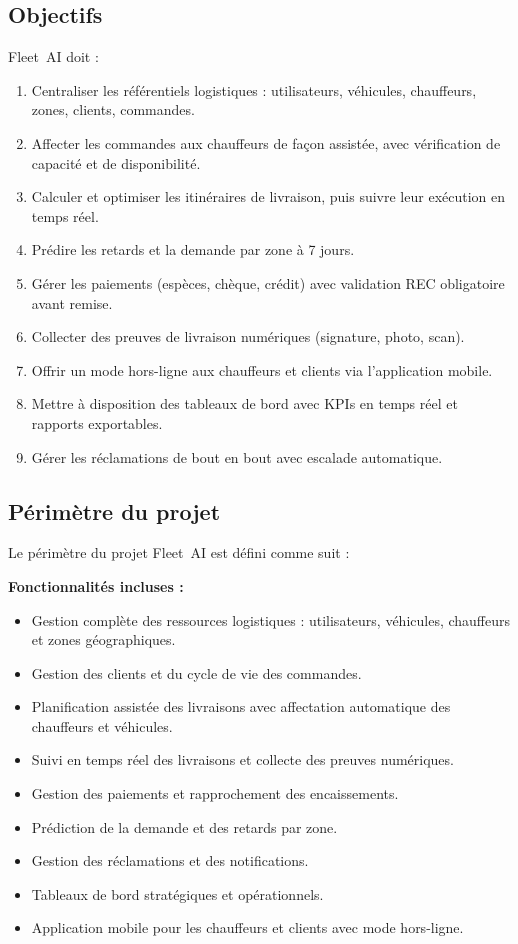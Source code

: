 \subsection{Objectifs}
Fleet~AI doit :
\begin{enumerate}
    \item Centraliser les référentiels logistiques : utilisateurs, véhicules, chauffeurs, zones, clients, commandes.
    \item Affecter les commandes aux chauffeurs de façon assistée, avec vérification de capacité et de disponibilité.
    \item Calculer et optimiser les itinéraires de livraison, puis suivre leur exécution en temps réel.
    \item Prédire les retards et la demande par zone à 7 jours.
    \item Gérer les paiements (espèces, chèque, crédit) avec validation REC obligatoire avant remise.
    \item Collecter des preuves de livraison numériques (signature, photo, scan).
    \item Offrir un mode hors-ligne aux chauffeurs et clients via l'application mobile.
    \item Mettre à disposition des tableaux de bord avec KPIs en temps réel et rapports exportables.
    \item Gérer les réclamations de bout en bout avec escalade automatique.
\end{enumerate}

\subsection{Périmètre du projet}
Le périmètre du projet Fleet~AI est défini comme suit :

\textbf{Fonctionnalités incluses :}
\begin{itemize}
    \item[$\bullet$] Gestion complète des ressources logistiques : utilisateurs, véhicules, chauffeurs et zones géographiques.
    \item[$\bullet$] Gestion des clients et du cycle de vie des commandes.
    \item[$\bullet$] Planification assistée des livraisons avec affectation automatique des chauffeurs et véhicules.
    \item[$\bullet$] Suivi en temps réel des livraisons et collecte des preuves numériques.
    \item[$\bullet$] Gestion des paiements et rapprochement des encaissements.
    \item[$\bullet$] Prédiction de la demande et des retards par zone.
    \item[$\bullet$] Gestion des réclamations et des notifications.
    \item[$\bullet$] Tableaux de bord stratégiques et opérationnels.
    \item[$\bullet$] Application mobile pour les chauffeurs et clients avec mode hors-ligne.
\end{itemize}

